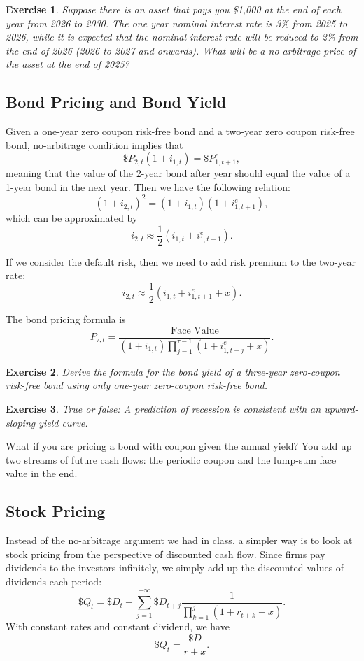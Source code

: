 \documentclass[12pt]{article}
\newtheorem{exercise}{Exercise}
\begin{document}
\begin{exercise}
    Suppose there is an asset that pays you \$1,000 at the end of each year from 2026 to 2030. The one year nominal interest rate is 3\% from 2025 to 2026, while it is expected that the nominal interest rate will be reduced to 2\% from the end of 2026 (2026 to 2027 and onwards). What will be a no-arbitrage price of the asset at the end of 2025?
\end{exercise}

\subsection*{Bond Pricing and Bond Yield}
Given a one-year zero coupon risk-free bond and a two-year zero coupon risk-free bond, no-arbitrage condition implies that
\[\$P_{2,t} (1 + i_{1,t}) = \$P_{1, t+1}^e,\]
meaning that the value of the 2-year bond after year should equal the value of a 1-year bond in the next year. Then we have the following relation:
\[(1 + i_{2,t})^2 = (1 + i_{1,t})(1 + i_{1, t+1}^e),\]
which can be approximated by
\[ i_{2,t} \approx \frac{1}{2}(i_{1,t} + i_{1, t+1}^e).\]

If we consider the default risk, then we need to add risk premium to the two-year rate:
\[ i_{2,t} \approx \frac{1}{2}(i_{1,t} + i_{1, t+1}^e + x).\]

The bond pricing formula is
\[ P_{\tau,t} = \frac{\text{Face Value}}{(1+i_{1,t})\prod_{j = 1}^{\tau-1}(1+i_{1,t+j}^e+x)}.\]

\begin{exercise}
    Derive the formula for the bond yield of a three-year zero-coupon risk-free bond using only one-year zero-coupon risk-free bond.
\end{exercise}

\begin{exercise}
    True or false: A prediction of recession is consistent with an upward-sloping yield curve.
\end{exercise}

What if you are pricing a bond with coupon given the annual yield? You add up two streams of future cash flows: the periodic coupon and the lump-sum face value in the end.

\subsection*{Stock Pricing}
Instead of the no-arbitrage argument we had in class, a simpler way is to look at stock pricing from the perspective of discounted cash flow. Since firms pay dividends to the investors infinitely, we simply add up the discounted values of dividends each period:
\[ \$Q_t = \$D_t + \sum_{j=1}^{+\infty} \$D_{t+j} \frac{1}{\prod_{k=1}^j(1+r_{t+k} + x)}. \]
With constant rates and constant dividend, we have
\[ \$Q_t = \frac{\$D}{r+x}. \]
\end{document}
